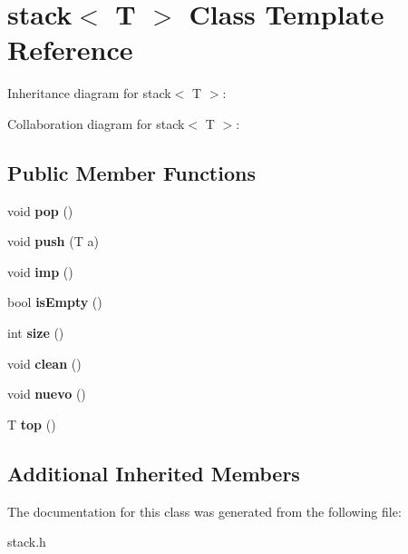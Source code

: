 \hypertarget{classstack}{}\section{stack$<$ T $>$ Class Template Reference}
\label{classstack}


Inheritance diagram for stack$<$ T $>$\+:


Collaboration diagram for stack$<$ T $>$\+:
\subsection*{Public Member Functions}
\begin{DoxyCompactItemize}
\item 
void {\bfseries pop} ()\hypertarget{classstack_ad6615a82d944ce2e9a9c260b1d126666}{}\label{classstack_ad6615a82d944ce2e9a9c260b1d126666}

\item 
void {\bfseries push} (T a)\hypertarget{classstack_abf33b388e9a56cf21d206b7221263f44}{}\label{classstack_abf33b388e9a56cf21d206b7221263f44}

\item 
void {\bfseries imp} ()\hypertarget{classstack_ac015b3bfb07d84cf4238dc27a7b61dd5}{}\label{classstack_ac015b3bfb07d84cf4238dc27a7b61dd5}

\item 
bool {\bfseries is\+Empty} ()\hypertarget{classstack_a0020d7922c8429188d2e23aaaa2cdc71}{}\label{classstack_a0020d7922c8429188d2e23aaaa2cdc71}

\item 
int {\bfseries size} ()\hypertarget{classstack_a1577ac10f88c5d6bdbbd9f8f61344b91}{}\label{classstack_a1577ac10f88c5d6bdbbd9f8f61344b91}

\item 
void {\bfseries clean} ()\hypertarget{classstack_ab3ae4b6ab3e862f4b9b5c3c3a88cfe5f}{}\label{classstack_ab3ae4b6ab3e862f4b9b5c3c3a88cfe5f}

\item 
void {\bfseries nuevo} ()\hypertarget{classstack_a7e5a5321889bb8e34871e1c194eec59b}{}\label{classstack_a7e5a5321889bb8e34871e1c194eec59b}

\item 
T {\bfseries top} ()\hypertarget{classstack_a6093fd7036685b3d9ea89e96609465ac}{}\label{classstack_a6093fd7036685b3d9ea89e96609465ac}

\end{DoxyCompactItemize}
\subsection*{Additional Inherited Members}


The documentation for this class was generated from the following file\+:\begin{DoxyCompactItemize}
\item 
stack.\+h\end{DoxyCompactItemize}
